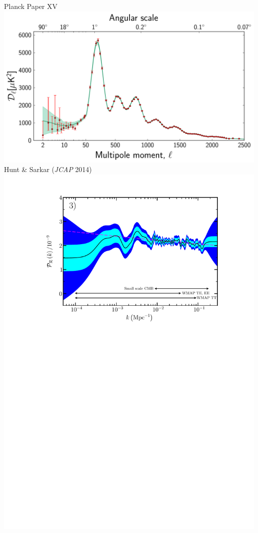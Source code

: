\documentclass[xcolor=dvipsnames]{beamer}
\begin{document}
  \begin{columns}[t]
    \centering\tiny Planck Paper XV
    \includegraphics[width=\columnwidth]{cmbtot_loglin}
    \centering\tiny Hunt \& Sarkar (\textit{JCAP} 2014)
    \includegraphics[width=\columnwidth, trim = 60 0 0 0, clip=true]{fig18c}
  \end{columns}
\end{document}
